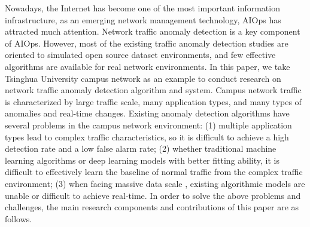 \begin{abstract}



\end{abstract}

\begin{abstract*}
  Nowadays, the Internet has become one of the most important information infrastructure, as an emerging network management technology, AIOps has attracted much attention. Network traffic anomaly detection is a key component of AIOps. However, most of the existing traffic anomaly detection studies are oriented to simulated open source dataset environments, and few effective algorithms are available for real network environments. In this paper, we take Tsinghua University campus network as an example to conduct research on network traffic anomaly detection algorithm and system. Campus network traffic is characterized by large traffic scale, many application types, and many types of anomalies and real-time changes. Existing anomaly detection algorithms have several problems in the campus network environment: (1) multiple application types lead to complex traffic characteristics, so it is difficult to achieve a high detection rate and a low false alarm rate; (2) whether traditional machine learning algorithms or deep learning models with better fitting ability, it is difficult to effectively learn the baseline of normal traffic from the complex traffic environment; (3) when facing massive data scale , existing algorithmic models are unable or difficult to achieve real-time. In order to solve the above problems and challenges, the main research components and contributions of this paper are as follows.


\end{abstract*}
